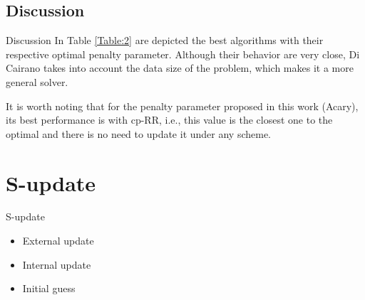 \documentclass[8pt,red]{beamer}
\theoremstyle{plain}
\theoremstyle{definition}
\theoremstyle{remark}
\begin{document}
\subsection{Discussion}
\begin{frame}{Discussion}
In Table \ref{Table:2} are depicted the best algorithms with their respective optimal penalty parameter. Although their behavior are very close, Di Cairano takes into account the data size of the problem, which makes it a more general solver.

\begin{table}[h!]
\caption{Comparison of best algorithms.}
\label{Table:2}
\end{table}


It is worth noting that for the penalty parameter proposed in this work (Acary), its best performance is with cp-RR, i.e., this value is the closest one to the optimal and there is no need to update it under any scheme.
\end{frame}

\section{S-update}
\begin{frame}{S-update}
\begin{itemize}
\item External update
\item Internal update
\item Initial guess
\end{itemize}
\end{frame}
\end{document}
